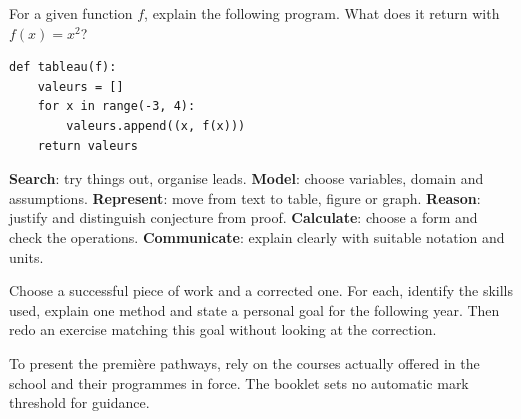 \begin{example}For a given function $f$, explain the following program. What does it return with $f(x)=x^2$?\end{example}
\begin{lstlisting}
def tableau(f):
    valeurs = []
    for x in range(-3, 4):
        valeurs.append((x, f(x)))
    return valeurs
\end{lstlisting}
\begin{keypoint}
\textbf{Search}: try things out, organise leads. \textbf{Model}: choose variables, domain and assumptions. \textbf{Represent}: move from text to table, figure or graph. \textbf{Reason}: justify and distinguish conjecture from proof. \textbf{Calculate}: choose a form and check the operations. \textbf{Communicate}: explain clearly with suitable notation and units.
\end{keypoint}
\begin{example}Choose a successful piece of work and a corrected one. For each, identify the skills used, explain one method and state a personal goal for the following year. Then redo an exercise matching this goal without looking at the correction.\end{example}
\begin{teachernote}To present the première pathways, rely on the courses actually offered in the school and their programmes in force. The booklet sets no automatic mark threshold for guidance.\end{teachernote}

